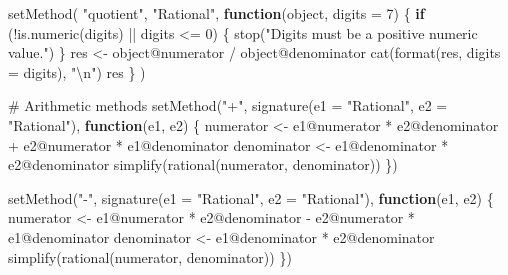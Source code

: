 \documentclass[
  12pt,
]{article}
\newenvironment{Shaded}{\begin{snugshade}}{\end{snugshade}}
\newcommand{\AttributeTok}[1]{\textcolor[rgb]{0.40,0.45,0.13}{#1}}
\newcommand{\CommentTok}[1]{\textcolor[rgb]{0.37,0.37,0.37}{#1}}
\newcommand{\ControlFlowTok}[1]{\textcolor[rgb]{0.00,0.23,0.31}{\textbf{#1}}}
\newcommand{\DecValTok}[1]{\textcolor[rgb]{0.68,0.00,0.00}{#1}}
\newcommand{\FunctionTok}[1]{\textcolor[rgb]{0.28,0.35,0.67}{#1}}
\newcommand{\NormalTok}[1]{\textcolor[rgb]{0.00,0.23,0.31}{#1}}
\newcommand{\OtherTok}[1]{\textcolor[rgb]{0.00,0.23,0.31}{#1}}
\newcommand{\SpecialCharTok}[1]{\textcolor[rgb]{0.37,0.37,0.37}{#1}}
\newcommand{\StringTok}[1]{\textcolor[rgb]{0.13,0.47,0.30}{#1}}
\begin{document}
\begin{Shaded}
\begin{Highlighting}[]
\FunctionTok{setMethod}\NormalTok{(}
  \StringTok{"quotient"}\NormalTok{,}
  \StringTok{"Rational"}\NormalTok{,}
  \ControlFlowTok{function}\NormalTok{(object, }\AttributeTok{digits =} \DecValTok{7}\NormalTok{) \{}
    \ControlFlowTok{if}\NormalTok{ (}\SpecialCharTok{!}\FunctionTok{is.numeric}\NormalTok{(digits) }\SpecialCharTok{||}\NormalTok{ digits }\SpecialCharTok{\textless{}=} \DecValTok{0}\NormalTok{) \{}
      \FunctionTok{stop}\NormalTok{(}\StringTok{"Digits must be a positive numeric value."}\NormalTok{)}
\NormalTok{    \}}
\NormalTok{    res }\OtherTok{\textless{}{-}}\NormalTok{ object}\SpecialCharTok{@}\NormalTok{numerator }\SpecialCharTok{/}\NormalTok{ object}\SpecialCharTok{@}\NormalTok{denominator}
    \FunctionTok{cat}\NormalTok{(}\FunctionTok{format}\NormalTok{(res, }\AttributeTok{digits =}\NormalTok{ digits), }\StringTok{"}\SpecialCharTok{\textbackslash{}n}\StringTok{"}\NormalTok{)}
\NormalTok{    res}
\NormalTok{  \}}
\NormalTok{)}

\CommentTok{\# Arithmetic methods}
\FunctionTok{setMethod}\NormalTok{(}\StringTok{"+"}\NormalTok{, }\FunctionTok{signature}\NormalTok{(}\AttributeTok{e1 =} \StringTok{"Rational"}\NormalTok{, }\AttributeTok{e2 =} \StringTok{"Rational"}\NormalTok{), }\ControlFlowTok{function}\NormalTok{(e1, e2) \{}
\NormalTok{  numerator }\OtherTok{\textless{}{-}}\NormalTok{ e1}\SpecialCharTok{@}\NormalTok{numerator }\SpecialCharTok{*}\NormalTok{ e2}\SpecialCharTok{@}\NormalTok{denominator }\SpecialCharTok{+}\NormalTok{ e2}\SpecialCharTok{@}\NormalTok{numerator }\SpecialCharTok{*}\NormalTok{ e1}\SpecialCharTok{@}\NormalTok{denominator}
\NormalTok{  denominator }\OtherTok{\textless{}{-}}\NormalTok{ e1}\SpecialCharTok{@}\NormalTok{denominator }\SpecialCharTok{*}\NormalTok{ e2}\SpecialCharTok{@}\NormalTok{denominator}
  \FunctionTok{simplify}\NormalTok{(}\FunctionTok{rational}\NormalTok{(numerator, denominator))}
\NormalTok{\})}

\FunctionTok{setMethod}\NormalTok{(}\StringTok{"{-}"}\NormalTok{, }\FunctionTok{signature}\NormalTok{(}\AttributeTok{e1 =} \StringTok{"Rational"}\NormalTok{, }\AttributeTok{e2 =} \StringTok{"Rational"}\NormalTok{), }\ControlFlowTok{function}\NormalTok{(e1, e2) \{}
\NormalTok{  numerator }\OtherTok{\textless{}{-}}\NormalTok{ e1}\SpecialCharTok{@}\NormalTok{numerator }\SpecialCharTok{*}\NormalTok{ e2}\SpecialCharTok{@}\NormalTok{denominator }\SpecialCharTok{{-}}\NormalTok{ e2}\SpecialCharTok{@}\NormalTok{numerator }\SpecialCharTok{*}\NormalTok{ e1}\SpecialCharTok{@}\NormalTok{denominator}
\NormalTok{  denominator }\OtherTok{\textless{}{-}}\NormalTok{ e1}\SpecialCharTok{@}\NormalTok{denominator }\SpecialCharTok{*}\NormalTok{ e2}\SpecialCharTok{@}\NormalTok{denominator}
  \FunctionTok{simplify}\NormalTok{(}\FunctionTok{rational}\NormalTok{(numerator, denominator))}
\NormalTok{\})}


\end{Highlighting}
\end{Shaded}
\end{document}
